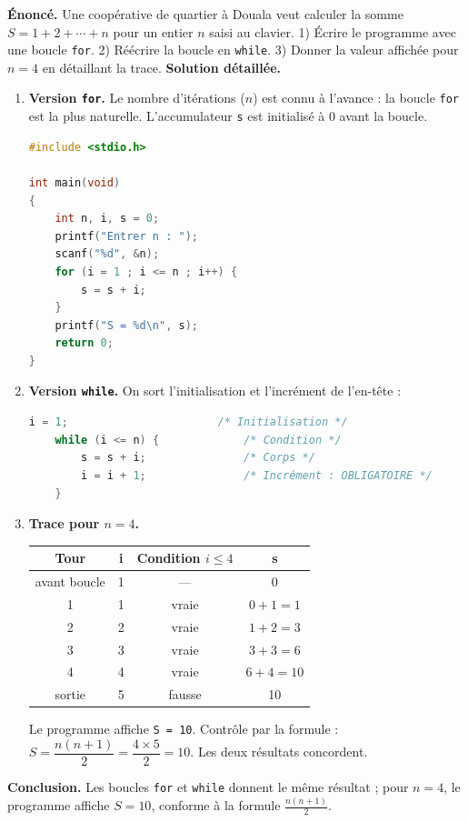 \documentclass[11pt]{article}
\begin{document}
\begin{exoresolu}
\textbf{Énoncé.} Une coopérative de quartier à Douala veut calculer la somme $S = 1 + 2 + \cdots + n$ pour un entier $n$ saisi au clavier. 1) Écrire le programme avec une boucle \texttt{for}. 2) Réécrire la boucle en \texttt{while}. 3) Donner la valeur affichée pour $n = 4$ en détaillant la trace.
\tcblower
\textbf{Solution détaillée.}
\begin{enumerate}
\item \textbf{Version \texttt{for}.} Le nombre d'itérations ($n$) est connu à l'avance : la boucle \texttt{for} est la plus naturelle. L'accumulateur \texttt{s} est initialisé à 0 avant la boucle.
\begin{lstlisting}[language=C]
#include <stdio.h>

int main(void)
{
    int n, i, s = 0;
    printf("Entrer n : ");
    scanf("%d", &n);
    for (i = 1 ; i <= n ; i++) {
        s = s + i;
    }
    printf("S = %d\n", s);
    return 0;
}
\end{lstlisting}
\item \textbf{Version \texttt{while}.} On sort l'initialisation et l'incrément de l'en-tête :
\begin{lstlisting}[language=C]
    i = 1;                       /* Initialisation */
    while (i <= n) {             /* Condition */
        s = s + i;               /* Corps */
        i = i + 1;               /* Incrément : OBLIGATOIRE */
    }
\end{lstlisting}
\item \textbf{Trace pour $n = 4$.}
\begin{center}
\begin{tabular}{|c|c|c|c|}
\hline
\rowcolor{popblueL} \textbf{Tour} & \textbf{i} & \textbf{Condition $i \le 4$} & \textbf{s} \\
\hline
avant boucle & 1 & --- & 0 \\
\hline
1 & 1 & vraie & $0+1=1$ \\
\hline
2 & 2 & vraie & $1+2=3$ \\
\hline
3 & 3 & vraie & $3+3=6$ \\
\hline
4 & 4 & vraie & $6+4=10$ \\
\hline
sortie & 5 & fausse & 10 \\
\hline
\end{tabular}
\end{center}
Le programme affiche \texttt{S = 10}. Contrôle par la formule : $S = \dfrac{n(n+1)}{2} = \dfrac{4 \times 5}{2} = 10$. Les deux résultats concordent.
\end{enumerate}
\textbf{Conclusion.} Les boucles \texttt{for} et \texttt{while} donnent le même résultat ; pour $n = 4$, le programme affiche $S = 10$, conforme à la formule $\frac{n(n+1)}{2}$.
\end{exoresolu}
\end{document}
